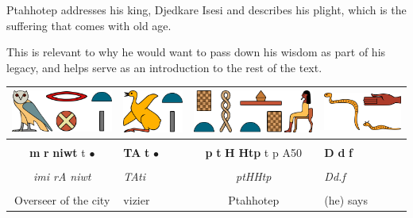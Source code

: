 Ptahhotep addresses his king, Djedkare Isesi and describes his plight, which is the suffering that comes with old age.

This is relevant to why he would want to pass down his wisdom as part of his legacy, and helps serve as an introduction to the rest of the text.

\pagebreak

\begin{center}

\begin{tabularx}{\linewidth}{cYcY}
	\includegraphics[scale=0.5]{word-images/1-1-1-imy-ra-niwt} &
	\includegraphics[scale=0.5]{word-images/1-1-2-tAti} &
	\includegraphics[scale=0.5]{word-images/1-1-3-ptH-Htp} &
	\includegraphics[scale=0.5]{word-images/1-1-4-Ddf} \\
	\hline \\ 
	\textbf{m} \textbf{r} \textbf{niwt} t $\bullet$ &
	\textbf{TA} \textbf{t} $\bullet$ &
	\textbf{p} \textbf{t} \textbf{H} \textbf{Htp} t p A50 &
	\textbf{D} \textbf{d} \textbf{f}\\
	\hline \\
	\textit{imi rA niwt} & \textit{TAti} & \textit{ptHHtp} & \textit{Dd.f} \\  
	\hline \\
	Overseer of the city & vizier & Ptahhotep & (he) says    
\end{tabularx}

\vspace{7.5mm}


\end{center}
